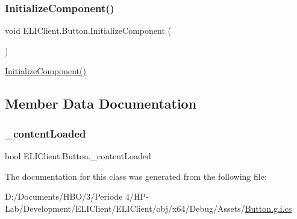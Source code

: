 \subsubsection{\texorpdfstring{Initialize\+Component()}{InitializeComponent()}}
{\footnotesize\ttfamily void E\+L\+I\+Client.\+Button.\+Initialize\+Component (\begin{DoxyParamCaption}{ }\end{DoxyParamCaption})\hspace{0.3cm}{\ttfamily [inline]}}



\hyperlink{class_e_l_i_client_1_1_button_a52a74c8b9cc2b93feb415c9ecf7e4cea}{Initialize\+Component()} 



\subsection{Member Data Documentation}
\mbox{\label{class_e_l_i_client_1_1_button_aae4232a364beb631c420268cf49fc8a3}} 
\subsubsection{\texorpdfstring{\+\_\+content\+Loaded}{\_contentLoaded}}
{\footnotesize\ttfamily bool E\+L\+I\+Client.\+Button.\+\_\+content\+Loaded\hspace{0.3cm}{\ttfamily [private]}}



The documentation for this class was generated from the following file\+:\begin{DoxyCompactItemize}
\item 
D\+:/\+Documents/\+H\+B\+O/3/\+Periode 4/\+H\+P-\/\+Lab/\+Development/\+E\+L\+I\+Client/\+E\+L\+I\+Client/obj/x64/\+Debug/\+Assets/\hyperlink{_button_8g_8i_8cs}{Button.\+g.\+i.\+cs}\end{DoxyCompactItemize}
